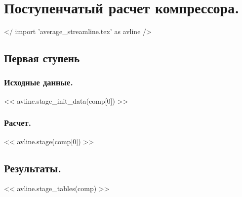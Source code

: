 \documentclass[a4paper,10pt]{article}
\begin{document}
    \section{Поступенчатый расчет компрессора.}

    </ import 'average_streamline.tex' as avline />

    \subsection{Первая ступень}
    \subsubsection{Исходные данные.}

    << avline.stage_init_data(comp[0]) >>

    \subsubsection{Расчет.}

    << avline.stage(comp[0]) >>

    \subsection{Результаты.}

    << avline.stage_tables(comp) >>
\end{document}

